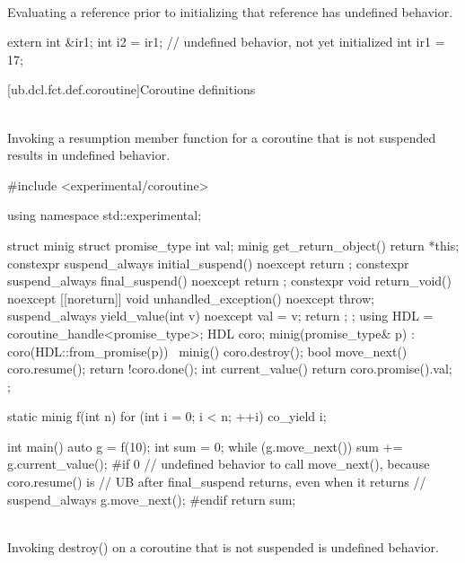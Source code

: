 \pnum
{} \\
Evaluating a reference
prior to initializing that
reference has undefined behavior.

\pnum
\begin{example}
\begin{codeblock}
extern int &ir1;
int i2 = ir1;   // undefined behavior,  not yet initialized
int ir1 = 17;
\end{codeblock}
\end{example}




[ub.dcl.fct.def.coroutine]{Coroutine definitions}

\pnum
{} \\
Invoking a resumption member function for a coroutine that is not suspended results in undefined behavior.

\pnum
\begin{example}
\begin{codeblock}
#include <experimental/coroutine>

using namespace std::experimental;

struct minig {
  struct promise_type {
    int val;
    minig get_return_object() { return {*this}; }
    constexpr suspend_always initial_suspend() noexcept { return {}; }
    constexpr suspend_always final_suspend() noexcept { return {}; }
    constexpr void return_void() noexcept {}
    [[noreturn]] void unhandled_exception() noexcept { throw; }
    suspend_always yield_value(int v) noexcept {
      val = v;
      return {};
    }
  };
  using HDL = coroutine_handle<promise_type>;
  HDL coro;
  minig(promise_type& p) : coro(HDL::from_promise(p)) {}
  ~minig() { coro.destroy(); }
  bool move_next() {
    coro.resume();
    return !coro.done();
  }
  int current_value() { return coro.promise().val; }
};

static minig f(int n) {
  for (int i = 0; i < n; ++i)
    co_yield i;
}

int main() {
  auto g = f(10);
  int sum = 0;
  while (g.move_next())
    sum += g.current_value();
#if 0
  // undefined behavior to call move_next(), because coro.resume() is
  // UB after final_suspend returns, even when it returns
  // suspend_always
  g.move_next();
#endif
  return sum;
}
\end{codeblock}
\end{example}


\pnum
{} \\
Invoking destroy() on a coroutine that is not suspended is undefined behavior.

